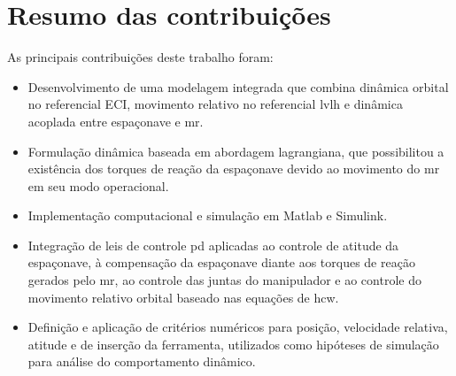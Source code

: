 \section{Resumo das contribuições}

As principais contribuições deste trabalho foram:

\begin{itemize}
    \item Desenvolvimento de uma modelagem integrada que combina dinâmica orbital no referencial ECI, movimento relativo no referencial \gls{lvlh} e dinâmica acoplada entre espaçonave e \gls{mr}.
    
    \item Formulação dinâmica baseada em abordagem lagrangiana, que possibilitou a existência dos torques de reação da espaçonave devido ao movimento do \gls{mr} em seu modo operacional.
    
    \item Implementação computacional e simulação em Matlab e Simulink.
    
    \item Integração de leis de controle \gls{pd} aplicadas ao controle de atitude da espaçonave, à compensação da espaçonave diante aos torques de reação gerados pelo \gls{mr}, ao controle das juntas do manipulador e ao controle do movimento relativo orbital baseado nas equações de \gls{hcw}.
    
    \item Definição e aplicação de critérios numéricos para posição, velocidade relativa, atitude e de inserção da ferramenta, utilizados como hipóteses de simulação para análise do comportamento dinâmico.
\end{itemize}